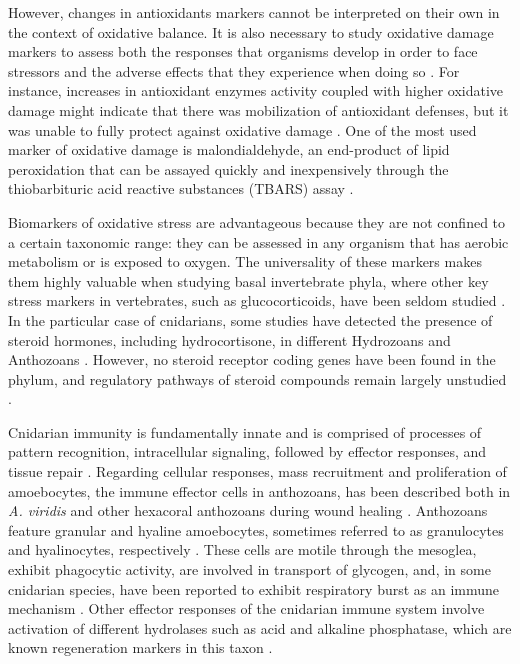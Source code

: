 \documentclass[final,3p,times,authoryear]{elsarticle}
\begin{document}
However, changes in antioxidants markers cannot be interpreted on their own in the context of oxidative balance. It is also necessary to study oxidative damage markers to assess both the responses that organisms develop in order to face stressors and the adverse effects that they experience when doing so \citep{Beaulieu2014}. For instance, increases in antioxidant enzymes activity coupled with higher oxidative damage might indicate that there was mobilization of antioxidant defenses, but it was unable to fully protect against oxidative damage \citep{Beaulieu2014}. One of the most used marker of oxidative damage is malondialdehyde, an end-product of lipid peroxidation that can be assayed quickly and inexpensively through the thiobarbituric acid reactive substances (TBARS) assay \citep{AguilarDiaz2020, Buege1978}.

Biomarkers of oxidative stress are advantageous because they are not confined to a certain taxonomic range: they can be assessed in any organism that has aerobic metabolism or is exposed to oxygen. The universality of these markers makes them highly valuable when studying basal invertebrate phyla, where other key stress markers in vertebrates, such as glucocorticoids, have been seldom studied \citep{Beaulieu2014, Coll2025, Valavanidis2006}. In the particular case of cnidarians, some studies have detected the presence of steroid hormones, including hydrocortisone, in different Hydrozoans and Anthozoans \citep{Nikitina2024}. However, no steroid receptor coding genes have been found in the phylum, and regulatory pathways of steroid compounds remain largely unstudied \citep{Tarrant2007, Baker2015}. 

Cnidarian immunity is fundamentally innate and is comprised of processes of pattern recognition, intracellular signaling, followed by effector responses, and tissue repair \citep{Parisi2020}. Regarding cellular responses, mass recruitment and proliferation of amoebocytes, the immune effector cells in anthozoans, has been described both in \textit{A. viridis} and other hexacoral anthozoans during wound healing \citep{Vargas-Angel2007, Mydlarz2008, Parisi2020, Snyder2021, LaCorte2023}. Anthozoans feature granular and hyaline amoebocytes, sometimes referred to as granulocytes and hyalinocytes, respectively \citep{Fabrello2023}. These cells are motile through the mesoglea, exhibit phagocytic activity, are involved in transport of glycogen, and, in some cnidarian species, have been reported to exhibit respiratory burst as an immune mechanism \citep{Larkman1984, Mydlarz2004, Mydlarz2006, Parisi2014, Snyder2021, Fabrello2023, LaCorte2023}. Other effector responses of the cnidarian immune system involve activation of different hydrolases such as acid and alkaline phosphatase, which are known regeneration markers in this taxon \citep{Trapani2016, Konada2020, Parisi2020}.
\end{document}
